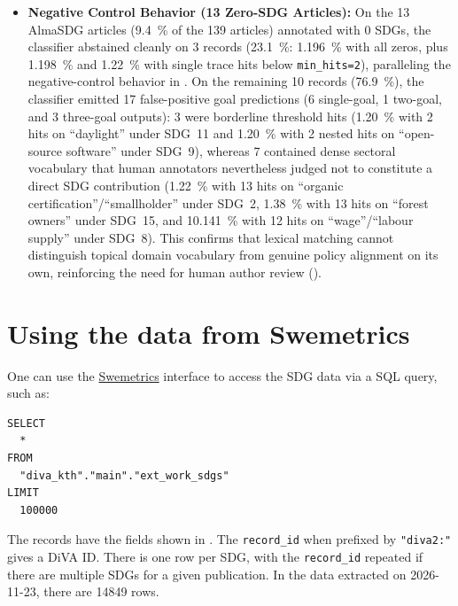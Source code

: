 \begin{itemize}
    \item \textbf{Negative Control Behavior (\num{13} Zero-SDG Articles):} On the \num{13} AlmaSDG articles (\qty{9.4}{\percent} of the \num{139} articles) annotated with \num{0} \glspl{SDG}, the classifier abstained cleanly on \num{3} records (\qty{23.1}{\percent}: \qty{1.196}{\percent} with all zeros, plus \qty{1.198}{\percent} and \qty{1.22}{\percent} with single trace hits below \texttt{min\_hits=2}), paralleling the negative-control behavior in . On the remaining \num{10} records (\qty{76.9}{\percent}), the classifier emitted \num{17} false-positive goal predictions (\num{6} single-goal, \num{1} two-goal, and \num{3} three-goal outputs): \num{3} were borderline threshold hits (\eg \qty{1.20}{\percent} with \num{2} hits on \enquote{daylight} under \gls{SDG}~11 and \qty{1.20}{\percent} with \num{2} nested hits on \enquote{open-source software} under \gls{SDG}~9), whereas \num{7} contained dense sectoral vocabulary that human annotators nevertheless judged not to constitute a direct \gls{SDG} contribution (\eg \qty{1.22}{\percent} with \num{13} hits on \enquote{organic certification}/\enquote{smallholder} under \gls{SDG}~2, \qty{1.38}{\percent} with \num{13} hits on \enquote{forest owners} under \gls{SDG}~15, and \qty{10.141}{\percent} with \num{12} hits on \enquote{wage}/\enquote{labour supply} under \gls{SDG}~8). This confirms that lexical matching cannot distinguish topical domain vocabulary from genuine policy alignment on its own, reinforcing the need for human author review ().
\end{itemize}
\clearpage
	
\section{Using the data from Swemetrics}
\label{appendix:UsingSwemetricsData}

One can use the \href{https://swemetrics.se/ui/}{Swemetrics} interface to access the \gls{SDG} data via a SQL query, such as:

\begin{verbatim}
SELECT
  *
FROM
  "diva_kth"."main"."ext_work_sdgs"
LIMIT
  100000
\end{verbatim}

The records have the fields shown in . The \texttt{record\_id} when prefixed by \texttt{"diva2:"} gives a \gls{DiVA} ID. There is one row per \gls{SDG}, with the \texttt{record\_id} repeated if there are multiple SDGs for a given publication. In the data extracted on 2026-11-23, there are \num{14849} rows.

